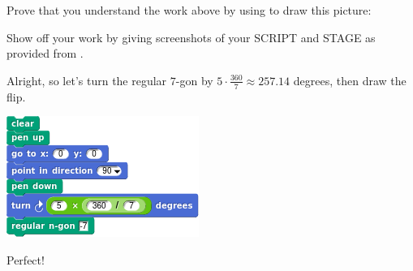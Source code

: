 \documentclass[noauthor,nooutcomes,12pt,handout]{ximera}
\begin{document}
\begin{question}
  Prove that you understand the work above by using
  to draw this picture:
  \begin{center}
  \end{center}
  Show off your work by giving screenshots of your SCRIPT and STAGE as
  provided from \snap.
  \begin{freeResponse}
    Alright, so let's turn the regular $7$-gon by $5\cdot \frac{360}{7}\approx 257.14$ degrees, then draw the flip.
    \begin{center}
      \includegraphics[width=.3\textwidth]{sevenGonBasicSCRIPT.png}   \qquad {}
    \end{center}
    Perfect!
  \end{freeResponse}
\end{question}
\end{document}
